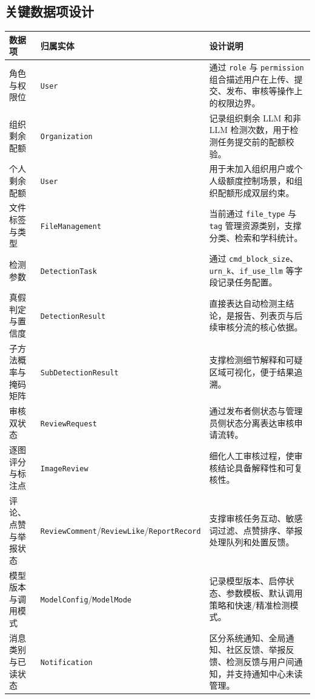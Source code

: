 \subsection{关键数据项设计}
\begin{longtable}{|p{3.8cm}|p{3.2cm}|p{6.8cm}|}
\hline
数据项 & 归属实体 & 设计说明 \\ \hline
角色与权限位 & \texttt{User} & 通过 \texttt{role} 与 \texttt{permission} 组合描述用户在上传、提交、发布、审核等操作上的权限边界。 \\ \hline
组织剩余配额 & \texttt{Organization} & 记录组织剩余 LLM 和非 LLM 检测次数，用于检测任务提交前的配额校验。 \\ \hline
个人剩余配额 & \texttt{User} & 用于未加入组织用户或个人级额度控制场景，和组织配额形成双层约束。 \\ \hline
文件标签与类型 & \texttt{FileManagement} & 当前通过 \texttt{file\_type} 与 \texttt{tag} 管理资源类别，支撑分类、检索和学科统计。 \\ \hline
检测参数 & \texttt{DetectionTask} & 通过 \texttt{cmd\_block\_size}、\texttt{urn\_k}、\texttt{if\_use\_llm} 等字段记录任务配置。 \\ \hline
真假判定与置信度 & \texttt{DetectionResult} & 直接表达自动检测主结论，是报告、列表页与后续审核分流的核心依据。 \\ \hline
子方法概率与掩码矩阵 & \texttt{SubDetectionResult} & 支撑检测细节解释和可疑区域可视化，便于结果追溯。 \\ \hline
审核双状态 & \texttt{ReviewRequest} & 通过发布者侧状态与管理员侧状态分离表达审核申请流转。 \\ \hline
逐图评分与标注点 & \texttt{ImageReview} & 细化人工审核过程，使审核结论具备解释性和可复核性。 \\ \hline
评论、点赞与举报状态 & \texttt{ReviewComment}/\texttt{ReviewLike}/\texttt{ReportRecord} & 支撑审核任务互动、敏感词过滤、点赞排序、举报处理队列和处置反馈。 \\ \hline
模型版本与调用模式 & \texttt{ModelConfig}/\texttt{ModelMode} & 记录模型版本、启停状态、参数模板、默认调用策略和快速/精准检测模式。 \\ \hline
消息类别与已读状态 & \texttt{Notification} & 区分系统通知、全局通知、社区反馈、举报反馈、检测反馈与用户间通知，并支持通知中心未读管理。 \\ \hline
\end{longtable}

